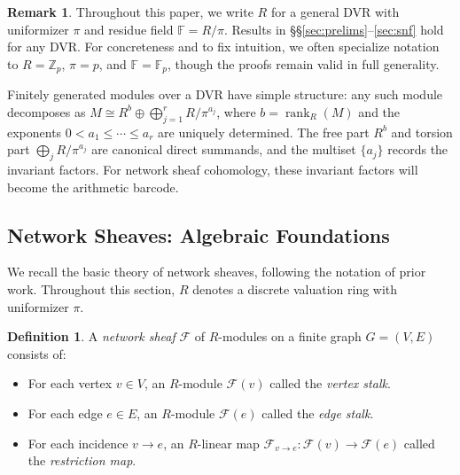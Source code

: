 \documentclass[11pt]{amsart}
\theoremstyle{plain}
\theoremstyle{definition}
\newtheorem{definition}[theorem]{Definition}
\newtheorem{example}[theorem]{Example}
\newtheorem{remark}[theorem]{Remark}
\newcommand{\Zp}{\mathbb{Z}_p}                        %
\newcommand{\Ring}{R}                          %
\newcommand{\unif}{\pi}                        %
\newcommand{\sheaf}[1]{\mathcal{#1}}                  %
\newcommand{\stalk}[2]{#1(#2)}                        %
\newcommand{\face}{\to}                               %
\newcommand{\res}[3]{#1_{#2 \face #3}}                  %
\DeclareMathOperator{\rank}{rank}
\begin{document}
\begin{remark}
Throughout this paper, we write $\Ring$ for a general DVR with uniformizer $\unif$ and residue field $\mathbb{F} = \Ring/\unif$. Results in §§\ref{sec:prelims}--\ref{sec:snf} hold for any DVR. For concreteness and to fix intuition, we often specialize notation to $\Ring = \Zp$, $\unif = p$, and $\mathbb{F} = \mathbb{F}_p$, though the proofs remain valid in full generality. 
\end{remark}

Finitely generated modules over a DVR have simple structure: any such module decomposes as $M \cong \Ring^b \oplus \bigoplus_{j=1}^r \Ring/\unif^{a_j}$, where $b = \rank_\Ring(M)$ and the exponents $0 < a_1 \le \cdots \le a_r$ are uniquely determined. The free part $\Ring^b$ and torsion part $\bigoplus_j \Ring/\unif^{a_j}$ are canonical direct summands, and the multiset $\{a_j\}$ records the invariant factors. For network sheaf cohomology, these invariant factors will become the arithmetic barcode.

\subsection{Network Sheaves: Algebraic Foundations}
\label{ssec:sheaves}

We recall the basic theory of network sheaves, following the notation of prior work. Throughout this section, $\Ring$ denotes a discrete valuation ring with uniformizer $\unif$.

\begin{definition}
\label{def:network-sheaf}
A \emph{network sheaf} $\sheaf{F}$ of $\Ring$-modules on a finite graph $G = (V,E)$ consists of:
\begin{itemize}
\item For each vertex $v \in V$, an $\Ring$-module $\stalk{\sheaf{F}}{v}$ called the \emph{vertex stalk}.
\item For each edge $e \in E$, an $\Ring$-module $\stalk{\sheaf{F}}{e}$ called the \emph{edge stalk}.
\item For each incidence $v \to e$, an $\Ring$-linear map $\res{\sheaf{F}}{v}{e}: \stalk{\sheaf{F}}{v} \to \stalk{\sheaf{F}}{e}$ called the \emph{restriction map}.
\end{itemize}
\end{definition}

\end{document}
